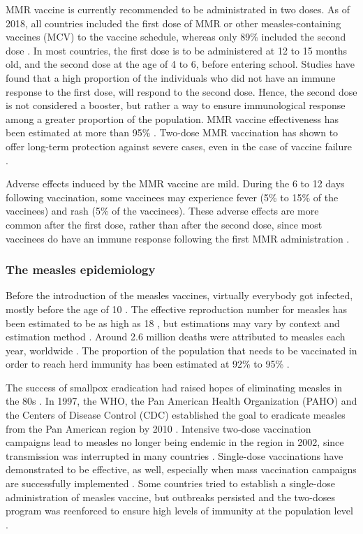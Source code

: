 MMR vaccine is currently recommended to be administrated in two doses. As of 2018, all countries included the first dose of MMR or other measles-containing vaccines (MCV) to the vaccine schedule, whereas only 89\% included the second dose \cite[]{Peck2018}. In most countries, the first dose is to be administered at 12 to 15 months old, and the second dose at the age of 4 to 6, before entering school. Studies have found that a high proportion of the individuals who did not have an immune response to the first dose, will respond to the second dose. Hence, the second dose is not considered a booster, but rather a way to ensure immunological response among a greater proportion of the population. MMR vaccine effectiveness has been estimated at more than 95\% \cite[]{Strebel2013}. Two-dose MMR vaccination has shown to offer long-term protection against severe cases, even in the case of vaccine failure \cite[]{Bonneton2020}.

Adverse effects induced by the MMR vaccine are mild. During the 6 to 12 days following vaccination, some vaccinees may experience fever (5\% to 15\% of the vaccinees) and rash (5\% of the vaccinees). These adverse effects are more common after the first dose, rather than after the second dose, since most vaccinees do have an immune response following the first MMR administration \cite[]{Strebel2013}.

\subsubsection{The measles epidemiology}
\label{sec:MeaslesEpi}

Before the introduction of the measles vaccines, virtually everybody got infected, mostly before the age of 10 \cite[]{Strebel2013}. The effective reproduction number for measles has been estimated to be as high as 18 \cite[]{Anderson1992}, but estimations may vary by context and estimation method \cite[]{Guerra2017}. Around 2.6 million deaths were attributed to measles each year, worldwide \cite[]{WHO_Factsheet_Measles}. The proportion of the population that needs to be vaccinated in order to reach herd immunity has been estimated at 92\% to 95\% \cite[]{Strebel2013}. 

The success of smallpox eradication had raised hopes of eliminating measles in the 80s \cite[]{Hopkins1982}. In 1997, the WHO, the Pan American Health Organization (PAHO) and the Centers of Disease Control (CDC) established the goal to eradicate measles from the Pan American region by 2010 \cite[]{MMWR_MeaslesErradication1997}. Intensive two-dose vaccination campaigns lead to measles no longer being endemic in the region in 2002, since transmission was interrupted in many countries \cite[]{Sever2011,DeQuadros2004}. Single-dose vaccinations have demonstrated to be effective, as well, especially when mass vaccination campaigns are successfully implemented \cite[]{Sever2011}. Some countries tried to establish a single-dose administration of measles vaccine, but outbreaks persisted and the two-doses program was reenforced to ensure high levels of immunity at the population level \cite[]{Strebel2013}.  

